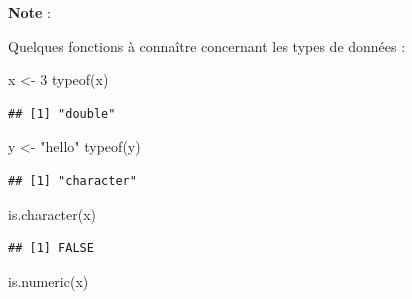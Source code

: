 \documentclass[
  11pt,
]{book}
\newcommand{\VERB}{\Verb[commandchars=\\\{\}]}
\newenvironment{Shaded}{\begin{snugshade}}{\end{snugshade}}
\newcommand{\DecValTok}[1]{\textcolor[rgb]{0.00,0.00,0.81}{#1}}
\newcommand{\FunctionTok}[1]{\textcolor[rgb]{0.00,0.00,0.00}{#1}}
\newcommand{\NormalTok}[1]{#1}
\newcommand{\OtherTok}[1]{\textcolor[rgb]{0.56,0.35,0.01}{#1}}
\newcommand{\StringTok}[1]{\textcolor[rgb]{0.31,0.60,0.02}{#1}}
\providecommand{\tightlist}{%
  \setlength{\itemsep}{0pt}\setlength{\parskip}{0pt}}
\numberwithin{equation}{section}
\numberwithin{countremarque}{section}
\newenvironment{notebox}{
  \begin{tcolorbox}[breakable, colback=jaune,coltext=black,
                  colframe=grisfonce]}
 {\end{tcolorbox}}
\begin{document}
\begin{notebox}

\textbf{Note} :

Quelques fonctions à connaître concernant les types de données :


\begin{Shaded}
\begin{Highlighting}[]
\NormalTok{x }\OtherTok{\textless{}{-}} \DecValTok{3}
\FunctionTok{typeof}\NormalTok{(x)}
\end{Highlighting}
\end{Shaded}

\begin{lstlisting}
## [1] "double"
\end{lstlisting}

\begin{Shaded}
\begin{Highlighting}[]
\NormalTok{y }\OtherTok{\textless{}{-}} \StringTok{"hello"}
\FunctionTok{typeof}\NormalTok{(y)}
\end{Highlighting}
\end{Shaded}

\begin{lstlisting}
## [1] "character"
\end{lstlisting}


\begin{Shaded}
\begin{Highlighting}[]
\FunctionTok{is.character}\NormalTok{(x)}
\end{Highlighting}
\end{Shaded}

\begin{lstlisting}
## [1] FALSE
\end{lstlisting}

\begin{Shaded}
\begin{Highlighting}[]
\FunctionTok{is.numeric}\NormalTok{(x)}
\end{Highlighting}
\end{Shaded}


\end{notebox}
\end{document}
